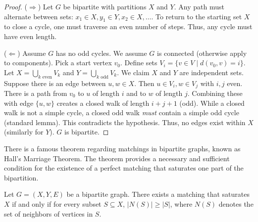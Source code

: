 \documentclass[oneside]{book}
\begin{document}
\begin{proof}
(\textbf{$\Rightarrow$}) Let $G$ be bipartite with partitions $X$ and $Y$. Any path must alternate between sets: $x_1 \in X, y_1 \in Y, x_2 \in X, \dots$. To return to the starting set $X$ to close a cycle, one must traverse an even number of steps. Thus, any cycle must have even length.

(\textbf{$\Leftarrow$}) Assume $G$ has no odd cycles. We assume $G$ is connected (otherwise apply to components). Pick a start vertex $v_0$.
Define sets $V_i = \{ v \in V \mid d(v_0, v) = i \}$.
Let $X = \bigcup_{k \text{ even}} V_k$ and $Y = \bigcup_{k \text{ odd}} V_k$.
We claim $X$ and $Y$ are independent sets.
Suppose there is an edge between $u, w \in X$. Then $u \in V_i, w \in V_j$ with $i, j$ even.
There is a path from $v_0$ to $u$ of length $i$ and to $w$ of length $j$. Combining these with edge $\{u, w\}$ creates a closed walk of length $i+j+1$ (odd).
While a closed walk is not a simple cycle, a closed odd walk \textit{must} contain a simple odd cycle (standard lemma). This contradicts the hypothesis.
Thus, no edges exist within $X$ (similarly for $Y$). $G$ is bipartite.
\end{proof}

There is a famous theorem regarding matchings in bipartite graphs, known as Hall's Marriage Theorem. The theorem provides a necessary and sufficient condition for the existence of a perfect matching that saturates one part of the bipartition.

\begin{theorem}
Let $G = (X, Y, E)$ be a bipartite graph. There exists a matching that saturates $X$ if and only if for every subset $S \subseteq X$, $|N(S)| \ge |S|$, where $N(S)$ denotes the set of neighbors of vertices in $S$.
\end{theorem}
\end{document}
